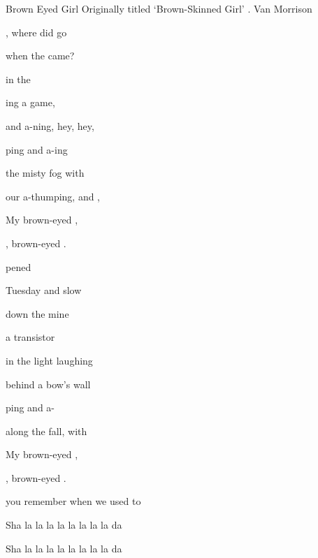 \begin{SBSong}{Brown Eyed Girl}
  {Originally titled `Brown-Skinned Girl' .}
  {Van Morrison}
  \begin{SBVerse}
    , where did  go

     when the  came?
    
     in the 
    
    ing a  game,
    
     and a-ning, hey, hey,
    
    ping and a-ing
    
     the misty  fog with
    
   our  a-thumping, and ,
  \end{SBVerse}
  \begin{SBChorus}
     My brown-eyed , 
    
     ,  brown-eyed .
  \end{SBChorus}
  \begin{SBVerse}
     pened
  
     Tuesday and  slow
  
     down the  mine
  
     a transistor 
  
     in the light laughing
  
     behind a bow's wall
  
    ping and a-
  
     along the fall, with  
  \end{SBVerse}
  \begin{SBChorus}
     My brown-eyed , 
    
     ,  brown-eyed .
     
      you remember when we used to 
     
     Sha la la la  la la la la  la  da 
     
     Sha la la la  la la la la  la  da
     

\end{SBChorus}
\end{SBSong}
